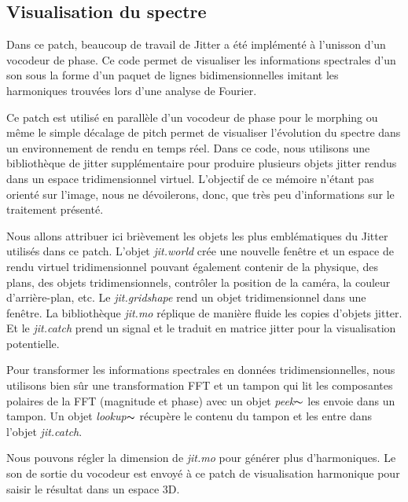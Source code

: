 \subsection{Visualisation du spectre}
    
    Dans ce patch, beaucoup de travail de Jitter a été implémenté à l'unisson d'un vocodeur de phase. Ce code permet de visualiser les informations spectrales d’un son sous la forme d’un paquet de lignes bidimensionnelles imitant les harmoniques trouvées lors d’une analyse de Fourier.

    Ce patch est utilisé en parallèle d'un vocodeur de phase pour le morphing ou même le simple décalage de pitch permet de visualiser l'évolution du spectre dans un environnement de rendu en temps réel. Dans ce code, nous utilisons une bibliothèque de jitter supplémentaire pour produire plusieurs objets jitter rendus dans un espace tridimensionnel virtuel. L'objectif de ce mémoire n'étant pas orienté sur l'image, nous ne dévoilerons, donc, que très peu d'informations sur le traitement présenté.

    Nous allons attribuer ici brièvement les objets les plus emblématiques du Jitter utilisés dans ce patch. L'objet \textit{jit.world} crée une nouvelle fenêtre et un espace de rendu virtuel tridimensionnel pouvant également contenir de la physique, des plans, des objets tridimensionnels, contrôler la position de la caméra, la couleur d'arrière-plan, etc. Le \textit{jit.gridshape} rend un objet tridimensionnel dans une fenêtre. La bibliothèque \textit{jit.mo} réplique de manière fluide les copies d’objets jitter. Et le \textit{jit.catch} prend un signal et le traduit en matrice jitter pour la visualisation potentielle.

    Pour transformer les informations spectrales en données tridimensionnelles, nous utilisons bien sûr une transformation FFT et un tampon qui lit les composantes polaires de la FFT (magnitude et phase) avec un objet \textit{peek$ \thicksim $} les envoie dans un tampon. Un objet \textit{lookup$ \thicksim $} récupère le contenu du tampon et les entre dans l'objet \textit{jit.catch}.

    Nous pouvons régler la dimension de \textit{jit.mo} pour générer plus d'harmoniques. Le son de sortie du vocodeur est envoyé à ce patch de visualisation harmonique pour saisir le résultat dans un espace 3D.


